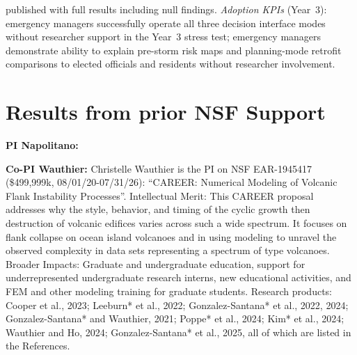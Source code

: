 \documentclass[11pt]{article}
\begin{document}
published with full results including null findings.
\textit{Adoption KPIs} (Year~3): emergency managers successfully operate all three
decision interface modes without researcher support in the Year~3 stress test;
emergency managers demonstrate ability to explain pre-storm risk maps and
planning-mode retrofit comparisons to elected officials and residents without
researcher involvement.


\vspace{-10pt}
\section{Results from prior NSF Support}

\noindent\textbf{PI Napolitano:}

\noindent\textbf{Co-PI Wauthier:}
Christelle Wauthier is the PI on NSF EAR-1945417 (\$499,999k, 08/01/20-07/31/26): “CAREER: Numerical Modeling of Volcanic Flank Instability Processes”. Intellectual Merit: This CAREER proposal addresses why the style, behavior, and timing of the cyclic growth then destruction of volcanic edifices varies across such a wide spectrum. It focuses on flank collapse on ocean island volcanoes and in using modeling to unravel the observed complexity in data sets representing a spectrum of type volcanoes. Broader Impacts: Graduate and undergraduate education, support for underrepresented undergraduate research interns, new educational activities, and FEM and other modeling training for graduate students. Research products: Cooper et al., 2023; Leeburn* et al., 2022; Gonzalez-Santana* et al., 2022, 2024; Gonzalez-Santana* and Wauthier, 2021; Poppe* et al., 2024; Kim* et al., 2024; Wauthier and Ho, 2024; Gonzalez-Santana* et al., 2025, all of which are listed in the References.
\end{document}
